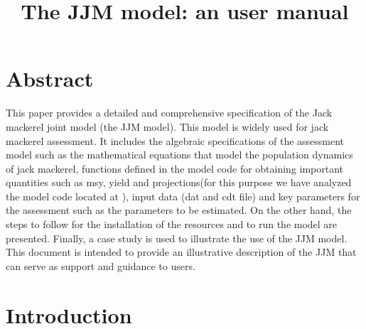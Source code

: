 \documentclass{article}
\title{The JJM model: an user manual}
\date{\parbox{\linewidth}{\centering%
  \skip
  Mirian GERONIMO \hspace*{3cm} Criscely LUJAN \endgraf\medskip
  Instituto del Mar del Perú (IMARPE)}
  }
\begin{document}
\maketitle
\tableofcontents
\newpage

\section*{Abstract} 

This paper provides a detailed and comprehensive specification of the Jack mackerel joint model (the JJM model). This model is widely used for jack mackerel assessment. It includes the algebraic specifications of the assessment model such as the mathematical equations that model the population dynamics of jack mackerel, functions defined in the model code for obtaining important quantities such as msy, yield and projections(for this purpose we have analyzed the model code located at 
 \cite{codejjm}), input data (dat and cdt file) and key parameters for the assessment such as the parameters to be estimated. On the other hand, the steps to follow for the installation of the resources and to run the model are presented. Finally, a case study is used to illustrate the use of the JJM model. This document is intended to provide an illustrative description of the JJM that can serve as support and guidance to users.

\section{Introduction} 
\end{document}
